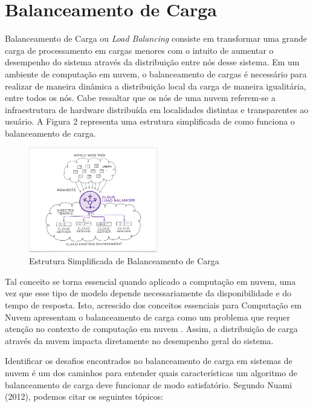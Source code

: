 \section{Balanceamento de Carga}\label{sec:balanceamento-carga}

Balanceamento de Carga ou \textit{Load Balancing} consiste em transformar uma grande carga de processamento em cargas menores com o intuito de aumentar o desempenho do sistema através da distribuição entre nós desse sistema. Em um ambiente de computação em nuvem, o balanceamento de cargas é necessário para realizar de maneira dinâmica a distribuição local da carga de maneira igualitária, entre todos os nós\cite{kaur2012load}. Cabe ressaltar que os nós de uma nuvem referem-se a infraestrutura de hardware distribuída em localidades distintas e transparentes ao usuário. A Figura 2 representa uma estrutura simplificada de como funciona o balanceamento de carga. 

\begin{figure}[htb]
	\caption{\label{fig:bal}Estrutura Simplificada de Balanceamento de Carga}
	\begin{center}
		\includegraphics[width=0.50\textwidth]{img/cloud_balancer.png}
	\end{center}
\end{figure} 

Tal conceito se torna essencial quando aplicado a computação em nuvem, uma vez que esse tipo de modelo depende necessariamente da disponibilidade e do tempo de resposta. Isto, acrescido dos conceitos essenciais para Computação em Nuvem apresentam o balanceamento de carga como um problema que requer atenção no contexto de computação em nuvem \cite{sran2013comparative}. Assim, a distribuição de carga através da nuvem impacta diretamente no desempenho geral do sistema. 

Identificar os desafios encontrados no balanceamento de carga em sistemas de nuvem é um dos caminhos para entender quais características um algoritmo de balanceamento de carga deve funcionar de modo satisfatório. Segundo Nuami (2012), podemos citar os seguintes tópicos: 

